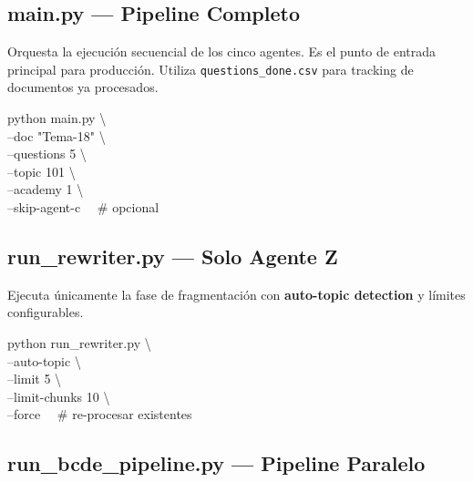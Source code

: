 \documentclass[10pt,twocolumn,letterpaper]{article}
\begin{document}
\subsection{main.py --- Pipeline Completo}

Orquesta la ejecuci\'on secuencial de los cinco agentes. Es el punto de entrada
principal para producci\'on. Utiliza \texttt{questions\_done.csv} para tracking
de documentos ya procesados.

\begin{tcolorbox}[colback=bglight, colframe=bordercolor, boxrule=0.5pt, arc=2pt]
{\small\ttfamily
python main.py \textbackslash\\
\hspace*{1em}--doc "Tema-18" \textbackslash\\
\hspace*{1em}--questions 5 \textbackslash\\
\hspace*{1em}--topic 101 \textbackslash\\
\hspace*{1em}--academy 1 \textbackslash\\
\hspace*{1em}--skip-agent-c ~~\# opcional
}
\end{tcolorbox}

\subsection{run\_rewriter.py --- Solo Agente Z}

Ejecuta \'unicamente la fase de fragmentaci\'on con \textbf{auto-topic detection}
y l\'imites configurables.

\begin{tcolorbox}[colback=bglight, colframe=bordercolor, boxrule=0.5pt, arc=2pt]
{\small\ttfamily
python run\_rewriter.py \textbackslash\\
\hspace*{1em}--auto-topic \textbackslash\\
\hspace*{1em}--limit 5 \textbackslash\\
\hspace*{1em}--limit-chunks 10 \textbackslash\\
\hspace*{1em}--force ~~\# re-procesar existentes
}
\end{tcolorbox}

\subsection{run\_bcde\_pipeline.py --- Pipeline Paralelo}
\end{document}
